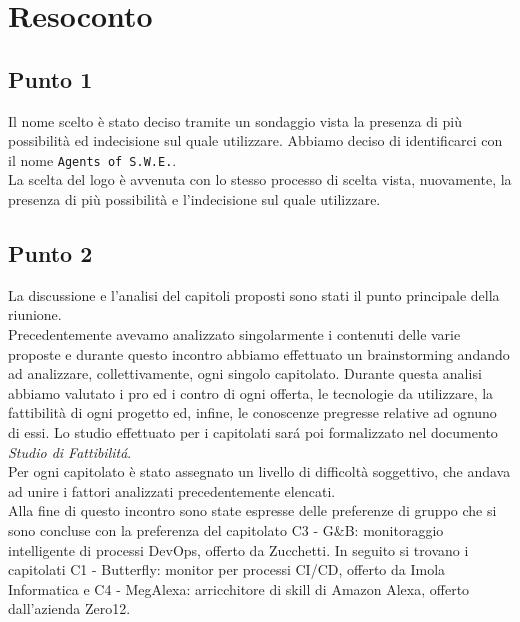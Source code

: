 \section{Resoconto}

\subsection{Punto 1}
Il nome scelto è stato deciso tramite un sondaggio vista la presenza di più possibilità ed indecisione sul quale utilizzare. Abbiamo deciso di identificarci con il nome \texttt{Agents of S.W.E.}.\\
La scelta del logo è avvenuta con lo stesso processo di scelta vista, nuovamente, la presenza di più possibilità e l'indecisione sul quale utilizzare.

\subsection{Punto 2}
La discussione e l'analisi del capitoli proposti sono stati il punto principale della riunione. \\
Precedentemente avevamo analizzato singolarmente i contenuti delle varie proposte e durante questo incontro abbiamo effettuato un brainstorming andando ad analizzare, collettivamente, ogni singolo capitolato. Durante questa analisi abbiamo valutato i pro ed i contro di ogni offerta, le tecnologie da utilizzare, la fattibilità di ogni progetto ed, infine, le conoscenze pregresse relative ad ognuno di essi. Lo studio effettuato per i capitolati sar\'a poi formalizzato nel documento \textit{Studio di Fattibilit\'a}. \\
Per ogni capitolato è stato assegnato un livello di difficoltà soggettivo, che andava ad unire i fattori analizzati precedentemente elencati.\\
Alla fine di questo incontro sono state espresse delle preferenze di gruppo che si sono concluse con la preferenza del capitolato  C3 - G\&B: monitoraggio intelligente di processi DevOps, offerto da Zucchetti. In seguito si trovano i capitolati C1 - Butterfly: monitor per processi CI/CD, offerto da Imola Informatica e C4  - MegAlexa: arricchitore di skill di Amazon Alexa, offerto dall'azienda Zero12. 
